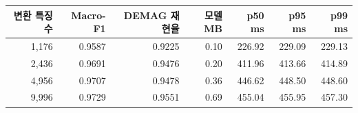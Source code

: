 \begin{tabular}{rrrrrrr}
\toprule
변환 특징 수 & Macro-F1 & DEMAG 재현율 & 모델 MB & p50 ms & p95 ms & p99 ms \\
\midrule
1,176 & 0.9587 & 0.9225 & 0.10 & 226.92 & 229.09 & 229.13 \\
2,436 & 0.9691 & 0.9476 & 0.20 & 411.96 & 413.66 & 414.89 \\
4,956 & 0.9707 & 0.9478 & 0.36 & 446.62 & 448.50 & 448.60 \\
9,996 & 0.9729 & 0.9551 & 0.69 & 455.04 & 455.95 & 457.30 \\
\bottomrule
\end{tabular}
